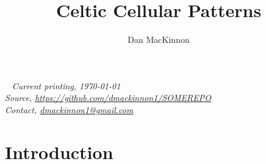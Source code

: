 \documentclass{tufte-book}
\title{Celtic Cellular Patterns}
\author[]{Dan MacKinnon}
\begin{document}
\maketitle


\newpage
\begin{fullwidth}
~\vfill
\thispagestyle{empty}
\setlength{\parindent}{0pt}
\textit{Current printing, \today}\\
\textit{Source, \url{https://github.com/dmackinnon1/SOMEREPO}}\\
\textit{Contact, \href{mailto://dmackinnon1@gmail.com}{dmackinnon1@gmail.com}}
\end{fullwidth}

\cleardoublepage

\chapter*{Introduction}

\end{document}
